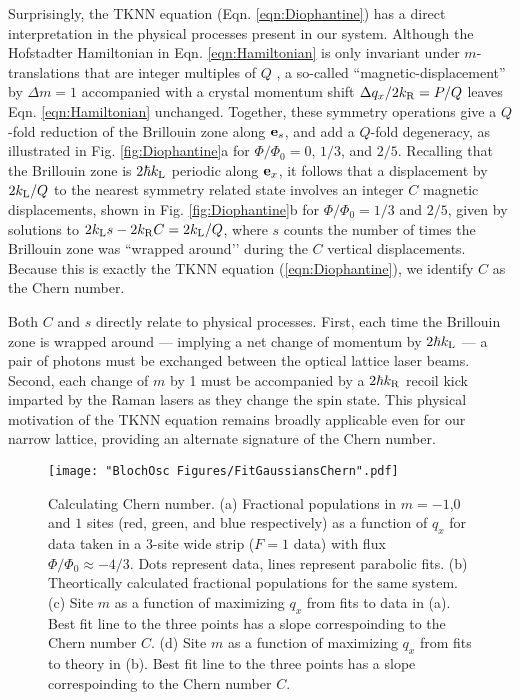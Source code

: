 Surprisingly, the TKNN equation (Eqn. \ref{eqn:Diophantine}) has a direct interpretation in the physical processes present in our system.  Although the Hofstadter Hamiltonian in Eqn. \ref{eqn:Hamiltonian} is only invariant under $m$-translations that are integer multiples of $Q$ , a so-called ``magnetic-displacement'' by $\Delta m=1$ accompanied with a crystal momentum shift $\Delta q_x/2 k_{\rm R} = P/Q$ leaves Eqn. \ref{eqn:Hamiltonian} unchanged.  Together, these symmetry operations give a $Q$-fold reduction of the Brillouin zone along ${\bf e}_s$, and add a $Q$-fold degeneracy, as illustrated in Fig. \ref{fig:Diophantine}a  for $\Phi/\Phi_0=0$, $1/3$, and $2/5$.  Recalling that the Brillouin zone is $2 \hbar k_{\rm L}$ periodic along ${\bf e}_x$, it follows that a displacement by $2 k_{\rm L}/Q$ to the nearest symmetry related state involves an integer $C$ magnetic displacements, shown in Fig. \ref{fig:Diophantine}b for $\Phi/\Phi_0=1/3$ and $2/5$, given by solutions to $2  k_{\rm L} s - 2  k_{\rm R} C = 2  k_{\rm L}/Q$, where $s$ counts the number of times the Brillouin zone was ``wrapped around’’ during the $C$ vertical displacements. Because this is exactly the TKNN equation (\ref{eqn:Diophantine}), we identify $C$ as the Chern number. 

Both $C$ and $s$ directly relate to physical processes.  First, each time the  Brillouin zone is wrapped around — implying a net change of momentum by $2 \hbar k_{\rm L}$ — a pair of photons must be exchanged between the optical lattice laser beams.  Second, each change of $m$ by 1 must be accompanied by a $2 \hbar k_{\rm R}$ recoil kick imparted by the Raman lasers as they change the spin state.  This physical motivation of the TKNN equation remains broadly applicable even for our narrow lattice, providing an alternate signature of the Chern number.

\begin{figure}
\texttt{[image: "BlochOsc Figures/FitGaussiansChern".pdf]}
\caption[Calculating Chern number]{Calculating Chern number. (a) Fractional populations in $m=-1$,$0$ and $1$ sites (red, green, and blue respectively) as a function of $q_x$ for data taken in a $3$-site wide strip ($F=1$ data) with flux $\Phi/\Phi_0\approx-4/3$. Dots represent data, lines represent parabolic fits. (b) Theortically calculated fractional populations for the same system. (c) Site $m$ as a function of maximizing $q_x$ from fits to data in (a). Best fit line to the three points has a slope correspoinding to the Chern number $C$. (d) Site $m$ as a function of maximizing $q_x$ from fits to theory in (b). Best fit line to the three points has a slope correspoinding to the Chern number $C$.  }
\label{fig:FitGaussiansChern}
\end{figure}

